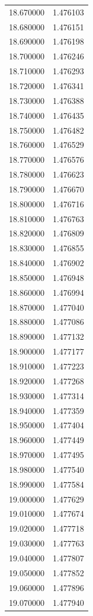 \begin{tabular}{rr}
18.670000 & 1.476103 \\
18.680000 & 1.476151 \\
18.690000 & 1.476198 \\
18.700000 & 1.476246 \\
18.710000 & 1.476293 \\
18.720000 & 1.476341 \\
18.730000 & 1.476388 \\
18.740000 & 1.476435 \\
18.750000 & 1.476482 \\
18.760000 & 1.476529 \\
18.770000 & 1.476576 \\
18.780000 & 1.476623 \\
18.790000 & 1.476670 \\
18.800000 & 1.476716 \\
18.810000 & 1.476763 \\
18.820000 & 1.476809 \\
18.830000 & 1.476855 \\
18.840000 & 1.476902 \\
18.850000 & 1.476948 \\
18.860000 & 1.476994 \\
18.870000 & 1.477040 \\
18.880000 & 1.477086 \\
18.890000 & 1.477132 \\
18.900000 & 1.477177 \\
18.910000 & 1.477223 \\
18.920000 & 1.477268 \\
18.930000 & 1.477314 \\
18.940000 & 1.477359 \\
18.950000 & 1.477404 \\
18.960000 & 1.477449 \\
18.970000 & 1.477495 \\
18.980000 & 1.477540 \\
18.990000 & 1.477584 \\
19.000000 & 1.477629 \\
19.010000 & 1.477674 \\
19.020000 & 1.477718 \\
19.030000 & 1.477763 \\
19.040000 & 1.477807 \\
19.050000 & 1.477852 \\
19.060000 & 1.477896 \\
19.070000 & 1.477940 \\

\end{tabular}
